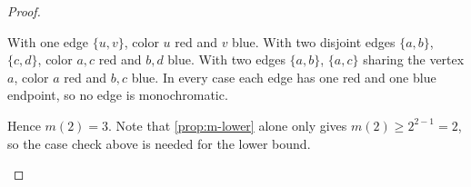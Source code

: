 \begin{proof}
\begin{enumerate}[(1), beginpenalty=10000]
\begin{itemize}
\begin{center}
            \end{center}
            With one edge \(\{u, v\}\), color \(u\) red and \(v\) blue. With two disjoint edges \(\{a, b\}\), \(\{c, d\}\), color \(a, c\) red and \(b, d\) blue. With two edges \(\{a, b\}\), \(\{a, c\}\) sharing the vertex \(a\), color \(a\) red and \(b, c\) blue. In every case each edge has one red and one blue endpoint, so no edge is monochromatic.
        \end{itemize}
        Hence \(m(2) = 3\). Note that \autoref{prop:m-lower} alone only gives \(m(2) \ge 2^{2-1} = 2\), so the case check above is needed for the lower bound.


\end{enumerate}
\end{proof}
